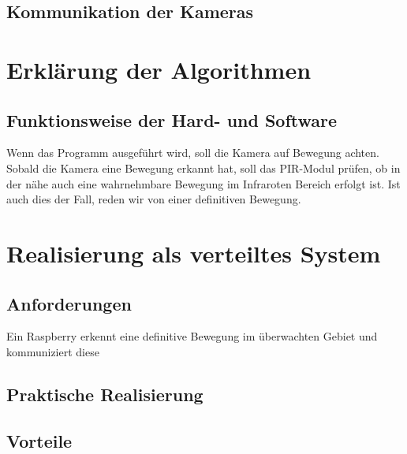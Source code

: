 \documentclass[12pt,a4paper]{scrreprt}
\begin{document}
\section{Kommunikation der Kameras}


\chapter{Erklärung der Algorithmen}
\section{Funktionsweise der Hard- und Software}
Wenn das Programm ausgeführt wird, soll die Kamera auf Bewegung achten. Sobald die Kamera eine Bewegung erkannt hat, soll das PIR-Modul prüfen, ob in der nähe auch eine wahrnehmbare Bewegung im Infraroten Bereich erfolgt ist. Ist auch dies der Fall, reden wir von einer definitiven Bewegung. 


\chapter{Realisierung als verteiltes System}
\section{Anforderungen}
Ein Raspberry erkennt eine definitive Bewegung im überwachten Gebiet und kommuniziert diese 

\section{Praktische Realisierung}

\section{Vorteile}
\end{document}
